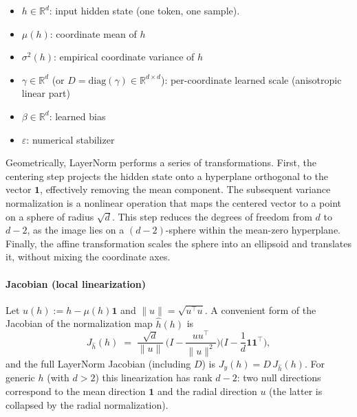 \documentclass[a4paper,12pt]{article}
\begin{document}

\begin{itemize}
  \item \(h\in\mathbb{R}^d\): input hidden state (one token, one sample).
  \item \(\mu(h)\): coordinate mean of \(h\)
  \item \(\sigma^2(h)\): empirical coordinate variance of \(h\)
  \item \(\gamma\in\mathbb{R}^d\) (or \(D=\mathrm{diag}(\gamma)\in\mathbb{R}^{d\times d}\)): per-coordinate learned scale (anisotropic linear part)
  \item \(\beta\in\mathbb{R}^d\): learned bias
  \item \(\varepsilon\): numerical stabilizer
\end{itemize}

Geometrically, LayerNorm performs a series of transformations. First, the centering step projects the hidden state onto a hyperplane orthogonal to the vector $\mathbf{1}$, effectively removing the mean component. The subsequent variance normalization is a nonlinear operation that maps the centered vector to a point on a sphere of radius $\sqrt{d}$. This step reduces the degrees of freedom from $d$ to $d-2$, as the image lies on a $(d-2)$-sphere within the mean-zero hyperplane. Finally, the affine transformation scales the sphere into an ellipsoid and translates it, without mixing the coordinate axes.

\paragraph{Jacobian (local linearization)}
Let \(u(h):=h-\mu(h)\mathbf1\) and \(\|u\|=\sqrt{u^\top u}\).  A convenient form of the Jacobian of the normalization map \(\widehat{h}(h)\) is
\[
J_{\widehat{h}}(h)
\;=\;
\frac{\sqrt{d}}{\|u\|}\,\Big(I - \frac{u u^\top}{\|u\|^2}\Big)\Big(I - \frac{1}{d}\mathbf1\mathbf1^\top\Big),
\]
and the full LayerNorm Jacobian (including \(D\)) is \(J_y(h)=D\,J_{\widehat{h}}(h)\).  For generic \(h\) (with \(d>2\)) this linearization has rank \(d-2\): two null directions correspond to the mean direction \(\mathbf1\) and the radial direction \(u\) (the latter is collapsed by the radial normalization).
\end{document}
